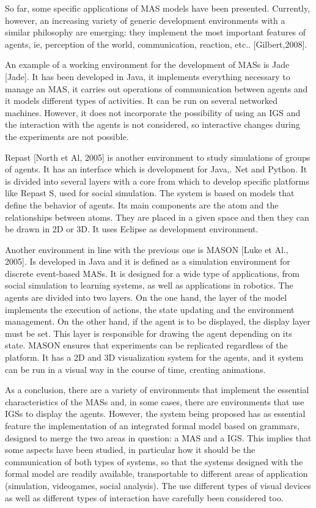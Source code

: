 \documentclass[runningheads]{llncs}
\begin{document}
So far, some specific applications of MAS models have been presented. Currently, however, an increasing variety of generic development environments with a similar philosophy are emerging: they implement the most important features of agents, ie, perception of the world, communication, reaction, etc.. [Gilbert,2008].

An example of a working environment for the development of MASs is Jade [Jade]. It has been developed in Java, it implements everything necessary to manage an MAS, it carries out operations of communication between agents and it models different types of activities. It can be run on several networked machines. However, it does not incorporate the possibility of using an IGS and the interaction with the agents is not considered, so interactive changes during the experiments are not possible. 

Repast [North et Al, 2005] is another environment to study simulations of groups of agents. It has an interface which is development for Java,. Net and Python. It is divided into several layers with a core from which to develop specific platforms like Repast S, used for social simulation. The system is based on models that define the behavior of agents. Its main components are the atom and the relationships between atoms. They are placed in a given space and then they can be drawn in 2D or 3D. It uses Eclipse as development environment.

Another environment in line with the previous one is MASON [Luke et Al., 2005]. Is developed in Java and it is defined as a simulation environment for discrete event-based MASs. It is designed for a wide type of applications, from social simulation to learning systems, as well as applications in robotics. The agents are divided into two layers. On the one hand, the layer of the model implements the execution of actions, the state updating and the environment management. On the other hand, if the agent is to be displayed, the display layer must be set. This layer is responsible for drawing the agent depending on its state. MASON ensures that experiments can be replicated regardless of the platform. It has a 2D and 3D visualization system for the agents, and it system can be run in a visual way in the course of time, creating animations.
 
As a conclusion, there are a variety of environments that implement the essential characteristics of the MASs and, in some cases, there are environments that use IGSs to display the agents. However, the system being proposed has as essential feature the implementation of an integrated formal model based on grammars, designed to merge the two areas in question: a MAS and a IGS. This implies that some aspects have been studied, in particular how it should be the communication of both types of systems, so that the systems designed with the formal model are readily available, transportable to different areas of application (simulation, videogames, social analysis). The use different types of visual devices as well as different types of interaction have carefully been considered too.
\end{document}
